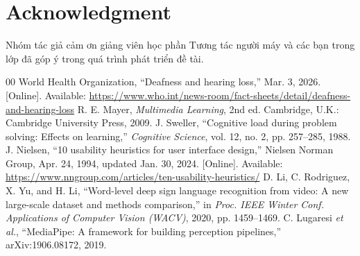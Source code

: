 \documentclass[conference]{IEEEtran}
\begin{document}
\section*{Acknowledgment}
Nhóm tác giả cảm ơn giảng viên học phần Tương tác người máy và các bạn trong lớp đã góp ý trong quá trình phát triển đề tài.

\begin{thebibliography}{00}
 World Health Organization, ``Deafness and hearing loss,'' Mar. 3, 2026. [Online]. Available: \url{https://www.who.int/news-room/fact-sheets/detail/deafness-and-hearing-loss}
 R. E. Mayer, \textit{Multimedia Learning}, 2nd ed. Cambridge, U.K.: Cambridge University Press, 2009.
 J. Sweller, ``Cognitive load during problem solving: Effects on learning,'' \textit{Cognitive Science}, vol. 12, no. 2, pp. 257--285, 1988.
 J. Nielsen, ``10 usability heuristics for user interface design,'' Nielsen Norman Group, Apr. 24, 1994, updated Jan. 30, 2024. [Online]. Available: \url{https://www.nngroup.com/articles/ten-usability-heuristics/}
 D. Li, C. Rodriguez, X. Yu, and H. Li, ``Word-level deep sign language recognition from video: A new large-scale dataset and methods comparison,'' in \textit{Proc. IEEE Winter Conf. Applications of Computer Vision (WACV)}, 2020, pp. 1459--1469.
 C. Lugaresi \textit{et al.}, ``MediaPipe: A framework for building perception pipelines,'' arXiv:1906.08172, 2019.
\end{thebibliography}
\end{document}
